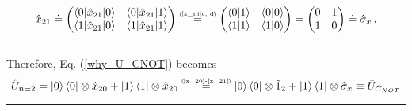\documentclass[11pt]{article}
\numberwithin{equation}{section} %
\numberwithin{figure}{section} %
\newcommand\numeq[1] %
  {\stackrel{\scriptscriptstyle(\mkern-1.5mu#1\mkern-1.5mu)}{=}}
\begin{document}
\begin{equation} \label{x_21}
\hat{x}_{21}\doteq\begin{pmatrix}\braket{0|\hat{x}_{21}|0}&\braket{0|\hat{x}_{21}|1}\\\braket{1|\hat{x}_{21}|0}&\braket{1|\hat{x}_{21}|1}\end{pmatrix}\numeq{\textrm{\ref{x_ni}c, d}}\begin{pmatrix}\braket{0|1}&\braket{0|0}\\\braket{1|1}&\braket{1|0}\end{pmatrix}=\begin{pmatrix}0&1\\1&0\end{pmatrix}\doteq\hat{\sigma}_x\,\textrm{,}
\end{equation}\\

Therefore, Eq. (\ref{why_U_CNOT}) becomes
\begin{equation} \label{why_U_CNOT2}
\hat{U}_{n=2}=\ket{0}\bra{0}\otimes\hat{x}_{20}+\ket{1}\bra{1}\otimes\hat{x}_{20}\numeq{\textrm{\ref{x_20}-\ref{x_21}}}\ket{0}\bra{0}\otimes\hat{1}_{2}+\ket{1}\bra{1}\otimes\hat{\sigma}_{x}\equiv\hat{U}_{C_{NOT}}
\end{equation}

\noindent
{\color{red} \rule{\linewidth}{0.5mm} }


\vspace{1cm}
\end{document}
